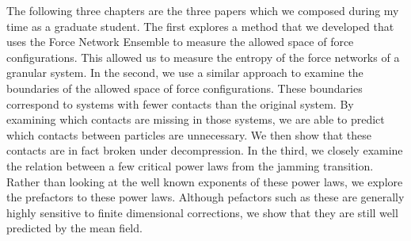The following three chapters are the three papers which we composed during my time as a graduate student. The first explores a method that we developed that uses the Force Network Ensemble to measure the allowed space of force configurations. This allowed us to measure the entropy of the force networks of a granular system. In the second, we use a similar approach to examine the boundaries of the allowed space of force configurations. These boundaries correspond to systems with fewer contacts than the original system. By examining which contacts are missing in those systems, we are able to predict which contacts between particles are unnecessary. We then show that these contacts are in fact broken under decompression. In the third, we closely examine the relation between a few critical power laws from the jamming transition. Rather than looking at the well known exponents of these power laws, we explore the prefactors to these power laws. Although pefactors such as these are generally highly sensitive to finite dimensional corrections, we show that they are still well predicted by the mean field.
